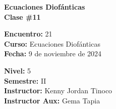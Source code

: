 \begin{center} \textbf
{
    \Large Ecuaciones Diofánticas \\ \vspace{2mm}Clase \#11
}
\end{center}

\begin{multicols}{2}
{
    \textbf{Encuentro:} 21\\
    \textbf{Curso:} Ecuaciones Diofánticas\\
    \textbf{Fecha:} 9 de noviembre de 2024\\
    \begin{flushright}
        \textbf{Nivel:} 5\\
        \textbf{Semestre:} II\\
        \textbf{Instructor:} Kenny Jordan Tinoco\\
        \textbf{Instructor Aux:} Gema Tapia
    \end{flushright}
}
\end{multicols}

\thispagestyle{first-page-style}